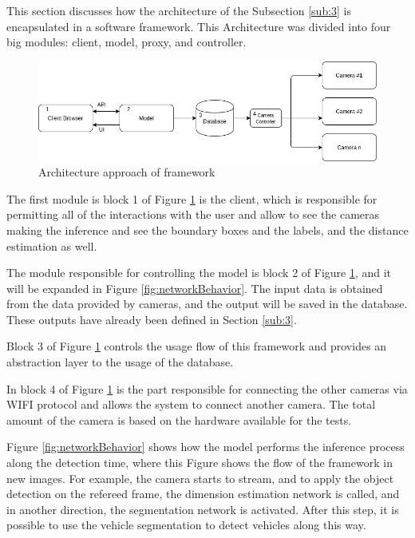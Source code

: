 This section discusses how the architecture of the Subsection \ref{sub:3} is encapsulated in a software framework. This Architecture was divided into four big modules: client, model, proxy, and controller. 



\begin{figure}[H]
\centering
\includegraphics[scale=0.6]{imagens/diagram.png}
\caption{Architecture approach of framework}
\label{fig:framework}
\end{figure}

The first module is block 1 of Figure \ref{fig:framework} is the client, which is responsible for permitting all of the interactions with the user and allow to see the cameras making the inference and see the boundary boxes and the labels, and the distance estimation as well.

The module responsible for controlling the model is block 2 of Figure \ref{fig:framework}, and it will be expanded in Figure \ref{fig:networkBehavior}. The input data is obtained from the data provided by cameras, and the output will be saved in the database. These outputs have already been defined in Section \ref{sub:3}. 

Block 3 of Figure \ref{fig:framework} controls the usage flow of this framework and provides an abstraction layer to the usage of the database. 

In block 4 of Figure \ref{fig:framework} is the part responsible for connecting the other cameras via WIFI protocol and allows the system to connect another camera. The total amount of the camera is based on the hardware available for the tests. 


Figure \ref{fig:networkBehavior} shows how the model performs the inference process along the detection time, where this Figure shows the flow of the framework in new images. For example, the camera starts to stream, and to apply the object detection on the refereed frame, the dimension estimation network is called, and in another direction, the segmentation network is activated. After this step, it is possible to use the vehicle segmentation to detect vehicles along this way.





